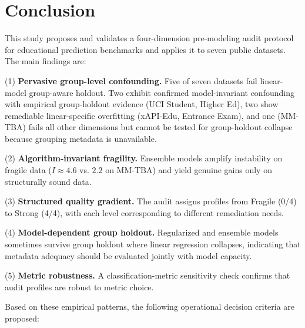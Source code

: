 \section{Conclusion}

This study proposes and validates a four-dimension pre-modeling audit protocol for educational prediction benchmarks and applies it to seven public datasets. The main findings are:

(1) \textbf{Pervasive group-level confounding.} Five of seven datasets fail linear-model group-aware holdout. Two exhibit confirmed model-invariant confounding with empirical group-holdout evidence (UCI Student, Higher Ed), two show remediable linear-specific overfitting (xAPI-Edu, Entrance Exam), and one (MM-TBA) fails all other dimensions but cannot be tested for group-holdout collapse because grouping metadata is unavailable.

(2) \textbf{Algorithm-invariant fragility.} Ensemble models amplify instability on fragile data ($I \approx 4.6$ vs. $2.2$ on MM-TBA) and yield genuine gains only on structurally sound data.

(3) \textbf{Structured quality gradient.} The audit assigns profiles from Fragile (0/4) to Strong (4/4), with each level corresponding to different remediation needs.

(4) \textbf{Model-dependent group holdout.} Regularized and ensemble models sometimes survive group holdout where linear regression collapses, indicating that metadata adequacy should be evaluated jointly with model capacity.

(5) \textbf{Metric robustness.} A classification-metric sensitivity check confirms that audit profiles are robust to metric choice.

Based on these empirical patterns, the following operational decision criteria are proposed:


